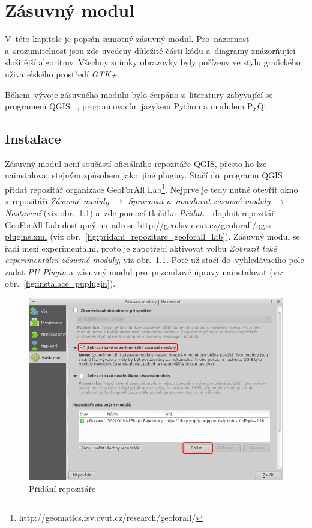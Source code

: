 \chapter{Zásuvný modul}
\label{4-plugin}

V~této kapitole je popsán samotný zásuvný modul. Pro~názornost a~srozumitelnost jsou zde uvedeny důležité části kódu a~diagramy znázorňující složitější algoritmy. Všechny snímky obrazovky byly pořízeny ve stylu grafického uživatelského prostředí \textit{GTK+}.

Během~vývoje zásuvného modulu bylo čerpáno z~literatury zabývající se programem QGIS \citep{pyqgis_book}~\citep{qgis_book}, programovacím jazykem Python \citep{dive_into_python} \citep{python3_oop_book} a modulem PyQt \citep{pyqt_book}.

\section{Instalace}
\label{instalace}

Zásuvný modul není součástí oficiálního repozitáře QGIS, přesto ho lze nainstalovat stejným způsobem jako~jiné pluginy. Stačí do~programu QGIS přidat repozitář organizace GeoForAll Lab\footnote{http://geomatics.fsv.cvut.cz/research/geoforall/}. Nejprve je tedy nutné otevřít okno s~repozitáři \textit{Zásuvné moduly $\rightarrow$ Spravovat a~instalovat zásuvné moduly $\rightarrow$ Nastavení} (viz obr.~\ref{fig:pridani_repozitare}) a~zde pomocí tlačítka \textit{Přidat...} doplnit repozitář GeoForAll Lab dostupný na~adrese \url{http://geo.fsv.cvut.cz/geoforall/qgis-plugins.xml} (viz obr.~\ref{fig:pridani_repozitare_geoforall_lab}). Zásuvný modul se řadí mezi experimentální, proto je zapotřebí aktivovat volbu \textit{Zobrazit také experimentální zásuvné moduly}, viz obr.~\ref{fig:pridani_repozitare}. Poté už stačí do~vyhledávacího pole zadat \textit{PU Plugin} a~zásuvný modul pro~pozemkové úpravy nainstalovat (viz obr.~\ref{fig:instalace_puplugin}).

	\begin{figure}[H]
		\centering
		\includegraphics[width=.7\textwidth]{./pictures/pridani_repozitare.png}
		\caption[Přidání repozitáře]{Přidání repozitáře}
		\label{fig:pridani_repozitare}
 	\end{figure}
 	

